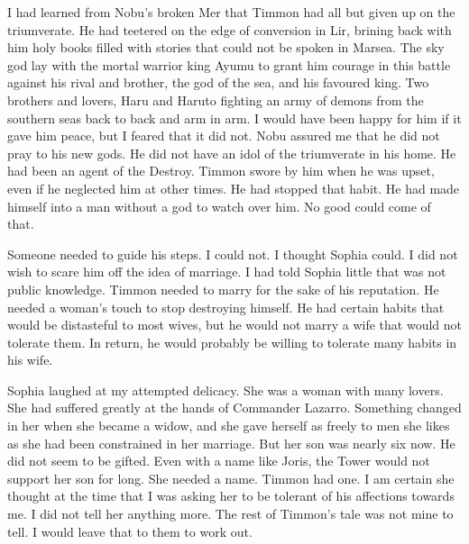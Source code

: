 \documentclass{article}
\begin{document}
I had learned from Nobu's broken Mer that Timmon had all but given up on the triumverate. He had teetered on the edge of conversion in Lir, brining back with him holy books filled with stories that could not be spoken in Marsea. The sky god lay with the mortal warrior king Ayumu to grant him courage in this battle against his rival and brother, the god of the sea, and his favoured king. Two brothers and lovers, Haru and Haruto fighting an army of demons from the southern seas back to back and arm in arm. I would have been happy for him if it gave him peace, but I feared that it did not. Nobu assured me that he did not pray to his new gods. He did not have an idol of the triumverate in his home. He had been an agent of the Destroy. Timmon swore by him when he was upset, even if he neglected him at other times. He had stopped that habit. He had made himself into a man without a god to watch over him. No good could come of that. 

Someone needed to guide his steps. I could not. I thought Sophia could. I did not wish to scare him off the idea of marriage. I had told Sophia little that was not public knowledge. Timmon needed to marry for the sake of his reputation. He needed a woman's touch to stop destroying himself. He had certain habits that would be distasteful to most wives, but he would not marry a wife that would not tolerate them. In return, he would probably be willing to tolerate many habits in his wife. 

Sophia laughed at my attempted delicacy. She was a woman with many lovers. She had suffered greatly at the hands of Commander Lazarro. Something changed in her when she became a widow, and she gave herself as freely to men she likes as she had been constrained in her marriage. But her son was nearly six now. He did not seem to be gifted. Even with a name like Joris, the Tower would not support her son for long. She needed a name. Timmon had one. I am certain she thought at the time that I was asking her to be tolerant of his affections towards me. I did not tell her anything more. The rest of Timmon's tale was not mine to tell. I would leave that to them to work out. 
\end{document}
